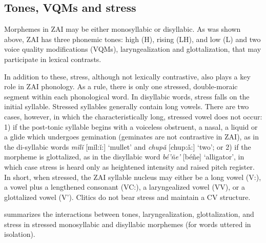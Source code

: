 \subsection{Tones, VQMs and stress}\label{tones}

Morphemes in ZAI may be either monosyllabic or disyllabic. As was shown above, ZAI has three phonemic tones: high (H), rising (LH), and low (L) and two voice quality modifications (VQMs), laryngealization and glottalization, that may participate in lexical contrasts. 

In addition to these, stress, although not lexically contrastive, also plays a key role in ZAI phonology. As a rule, there is only one stressed, double-moraic segment within each phonological word. In disyllabic words, stress falls on the initial syllable. Stressed syllables generally contain long vowels. There are two cases, however, in which the characteristically long, stressed vowel does not occur: 1) if the post-tonic syllable begins with a voiceless obstruent, a nasal, a liquid or a glide which undergoes gemination (geminates are not contrastive in ZAI), as in the di-syllabic words \textit{m\v{i}l\v{i}} [m\v{i}l:\v{i}:] `mullet' and \textit{chup\v{a}} [chup:\v{a}:] `two'; or 2) if the morpheme is glottalized, as in the disyllabic word \textit{b\'{e}'ñe'} [b\'{e}ñe] `alligator', in which case stress is heard only as heightened intensity and raised pitch register. In short, when stressed, the ZAI syllable nucleus may either be a long vowel (V:), a vowel plus a lengthened consonant (VC:), a laryngealized vowel (VV), or a glottalized vowel (V'). Clitics do not bear stress and maintain a CV structure.

 summarizes the interactions between tones, laryngealization, glottalization, and stress in stressed monosyllabic and disyllabic morphemes (for words uttered in isolation).

